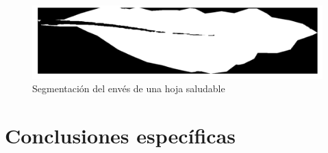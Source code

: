 \begin{figure}[H]
\centering
\includegraphics[scale=1]{images/special_case_backbone_binary.png}
\caption{Segmentación del envés de una hoja saludable}
\label{img:backbone_binary}
\end{figure}

\section{Conclusiones específicas}

